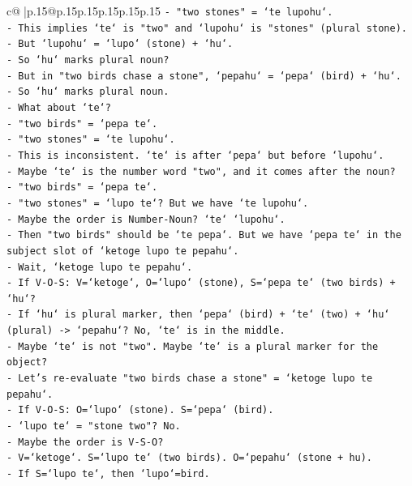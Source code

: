 \documentclass{article}
\begin{document}
{\begin{supertabular}{c@{$\;$}|p{.15\linewidth}@{}p{.15\linewidth}p{.15\linewidth}p{.15\linewidth}p{.15\linewidth}p{.15\linewidth}}
{{{\texttt{{-} "two stones" = `te lupohu`.} \\
\texttt{{-} This implies `te` is "two" and `lupohu` is "stones" (plural stone).} \\
\texttt{{-} But `lupohu` = `lupo` (stone) + `hu`.} \\
\texttt{{-} So `hu` marks plural noun?} \\
\texttt{{-} But in "two birds chase a stone", `pepahu` = `pepa` (bird) + `hu`.} \\
\texttt{{-} So `hu` marks plural noun.} \\
\texttt{{-} What about `te`?} \\
\texttt{{-} "two birds" = `pepa te`.} \\
\texttt{{-} "two stones" = `te lupohu`.} \\
\texttt{{-} This is inconsistent. `te` is after `pepa` but before `lupohu`.} \\
\texttt{{-} Maybe `te` is the number word "two", and it comes after the noun?} \\
\texttt{{-} "two birds" = `pepa te`.} \\
\texttt{{-} "two stones" = `lupo te`? But we have `te lupohu`.} \\
\texttt{{-} Maybe the order is Number{-}Noun? `te` `lupohu`.} \\
\texttt{{-} Then "two birds" should be `te pepa`. But we have `pepa te` in the subject slot of `ketoge lupo te pepahu`.} \\
\texttt{{-} Wait, `ketoge lupo te pepahu`.} \\
\texttt{{-} If V{-}O{-}S: V=`ketoge`, O=`lupo` (stone), S=`pepa te` (two birds) + `hu`?} \\
\texttt{{-} If `hu` is plural marker, then `pepa` (bird) + `te` (two) + `hu` (plural) {-}> `pepahu`? No, `te` is in the middle.} \\
\texttt{{-} Maybe `te` is not "two". Maybe `te` is a plural marker for the object?} \\
\texttt{{-} Let's re{-}evaluate "two birds chase a stone" = `ketoge lupo te pepahu`.} \\
\texttt{{-} If V{-}O{-}S: O=`lupo` (stone). S=`pepa` (bird).} \\
\texttt{{-} `lupo te` = "stone two"? No.} \\
\texttt{{-} Maybe the order is V{-}S{-}O?} \\
\texttt{{-} V=`ketoge`. S=`lupo te` (two birds). O=`pepahu` (stone + hu).} \\
\texttt{{-} If S=`lupo te`, then `lupo`=bird.} \\
}}}
\end{supertabular}}
\end{document}

